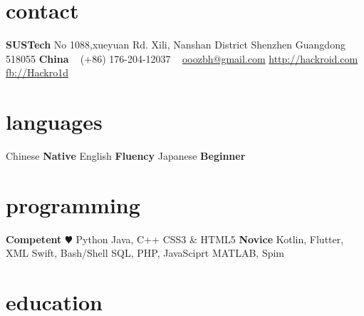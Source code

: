 \documentclass[]{friggeri-cv-a4}
\begin{document}


\begin{aside} %
\section{contact}
\textbf{SUSTech}
No 1088,xueyuan Rd.
Xili, Nanshan District
Shenzhen
Guangdong
518055
\textbf{China}
~
(+86) 176-204-12037
~
\href{mailto:ooozbh@gmail.com}{ooozbh@gmail.com}
\href{http://hackroid.com}{http://hackroid.com}
\href{http://www.facebook.com/Hackro1d}{fb://Hackro1d}
\section{languages}
Chinese \textbf{Native}
English \textbf{Fluency}
Japanese \textbf{Beginner}
\section{programming}
\textbf{Competent}
{\color{red} $\varheart$} Python
Java, C++
CSS3 \& HTML5
\textbf{Novice}
Kotlin, Flutter, XML
Swift, Bash/Shell
SQL, PHP, JavaSciprt
MATLAB, Spim
\end{aside}


\section{education}
\end{document}
